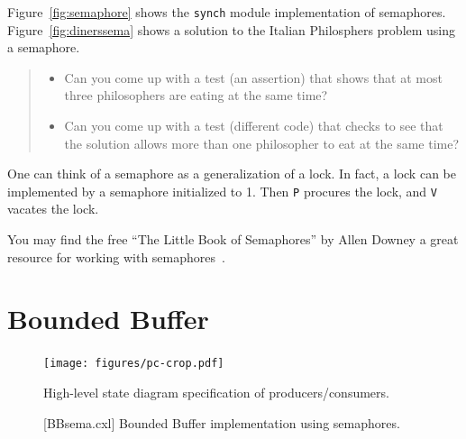 \documentclass{report}
\newenvironment{code}{
\tcolorbox
}{
\endtcolorbox
}
\begin{document}
Figure~\ref{fig:semaphore} shows the \texttt{synch} module implementation of
semaphores.
Figure~\ref{fig:dinerssema} shows a solution to the Italian Philosphers problem
using a semaphore.

\begin{quote}
\begin{itemize}
\item Can you come up with a test (an assertion) that shows that at most three
philosophers are eating at the same time?
\item Can you come up with a test (different code) that checks to see that
the solution allows more than one philosopher to eat at the same time?
\end{itemize}
\end{quote}

One can think of a semaphore as a generalization of a lock.  In fact, a
lock can be implemented by a semaphore initialized to 1.  Then \texttt{P}
procures the lock, and \texttt{V} vacates the lock.

You may find the free ``The Little Book of Semaphores'' by
Allen Downey a great resource for working with semaphores~\cite{Downey09}.

\chapter{Bounded Buffer}

\begin{figure}
\begin{center}
\texttt{[image: figures/pc-crop.pdf]}
\end{center}
\caption{High-level state diagram specification of producers/consumers.}
\label{fig:pc}
\end{figure}

\begin{figure}
\begin{code}
\end{code}
\caption{[BBsema.cxl] Bounded Buffer implementation using semaphores.}
\label{fig:boundedbuffer}
\end{figure}
\end{document}

